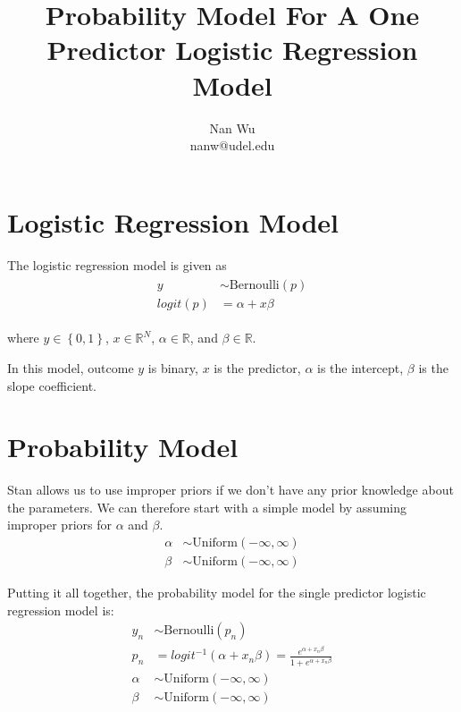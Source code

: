 \documentclass[12pt]{article}
\begin{document}
\title{Probability Model For A One Predictor Logistic Regression Model}
\author{Nan Wu \\ nanw@udel.edu}
\date{}
\maketitle

\section{Logistic Regression Model}

The logistic regression model is given as
\begin{align}
\begin{split}
  y &\sim \mathrm{Bernoulli} \left( p\right) \\
  logit\left( p\right)&=\alpha + x\beta
\end{split}
\end{align}

where $y \in \left\{0,1\right\}$, $x\in \mathbb{R}^N$, $\alpha \in \mathbb{R}$, and $\beta \in \mathbb{R}$.

In this model, outcome $y$ is binary, $x$ is the predictor, $\alpha$ is the intercept, $\beta$ is the slope coefficient.

\section{Probability Model}

Stan allows us to use improper priors if we don't have any prior knowledge about the parameters. We can therefore start with a simple model by assuming improper priors for $\alpha$ and $\beta$.
\begin{align*}
\alpha &\sim \mathrm{Uniform}\left( -\infty,\infty \right) \\
\beta &\sim \mathrm{Uniform}\left( -\infty,\infty \right)
\end{align*}

Putting it all together, the probability model for the single predictor logistic regression model is:
\begin{align*}
y_n &\sim \mathrm{Bernoulli} \left( p_n\right) \\
p_n &=logit^{-1}\left(\alpha + x_n\beta \right) = \frac{e^{\alpha + x_n\beta}}{1+e^{\alpha + x_n\beta}} \\
\alpha &\sim \mathrm{Uniform}\left( -\infty,\infty \right) \\
\beta &\sim \mathrm{Uniform}\left( -\infty,\infty \right)
\end{align*}
\end{document}

